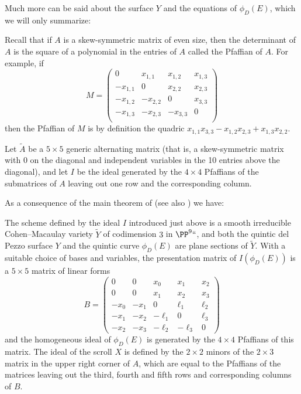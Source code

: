 Much more can be said about the surface $Y$ and the equations of $\phi_D(E)$, which we will only summarize:

\begin{fact}
Recall that if $A$ is a skew-symmetric matrix of even size,
%
then the determinant of $A$ is the square of a polynomial in the entries of $A$ called the Pfaffian of $A$. For example, if
%
$$
M = \begin{pmatrix}
0&x_{1,1}&x_{1,2}&x_{1,3}\\
-x_{1,1}&0&x_{2,2}&x_{2,3}\\
-x_{1,2}&-x_{2,2}&0&x_{3,3}\\
-x_{1,3}&-x_{2,3}&-x_{3,3}&0\\
\end{pmatrix}
$$
then the Pfaffian of $M$ is by definition the quadric $x_{1,1}x_{3,3}-x_{1,2}x_{2,3}+x_{1,3}x_{2,2}$.

Let $\tilde A$ be a $5\times 5$ generic alternating matrix (that is, a skew-symmetric matrix with 0 on the diagonal and independent variables
in the 10 entries above the diagonal), and let $I$ be the ideal
generated by the $4\times 4$ Pfaffians of
the submatrices of $A$ leaving out one row and the corresponding column.

\hskip-1pt As a consequence of the main theorem of  \cite{MR453723}
(see also \cite[Theorem 11]{Eisenbud1995}) we have:

\begin{proposition} \label{5x5 Pfaffians}
The scheme defined by
the ideal
$I$ introduced just above
is a smooth irreducible Cohen--Macaulay variety $\tilde Y$ of codimension
$3$ in $\PP^9` `$,
and both the quintic del Pezzo surface $Y$ and the quintic curve $\phi_D(E)$ are plane sections of $\tilde Y$.
With a suitable choice of bases and variables,  the presentation
matrix of $I(\phi_D(E))$ is
a $5\times 5$ matrix of linear forms
$$
B =\begin{pmatrix}
0&0&x_0&x_1&x_2\\
0&0&x_1&x_2&x_3\\
-x_0&-x_1&0&\ell_1&\ell_2\\
-x_1&-x_2&-\ell_1&0&\ell_3\\
-x_2&-x_3&-\ell_2&-\ell_3&0
\end{pmatrix}
$$
and
the homogeneous ideal of $\phi_D(E)$ is generated by the  $4\times 4$ Pfaffians of this matrix. The ideal of
the scroll $X$ is defined by the $2\times 2$ minors of the $2\times 3$ matrix in the upper right corner of $A$, which
are equal to the Pfaffians of the matrices leaving out the
third, fourth and fifth
rows
and corresponding columns of $B$.
\vspace*{-1.4\baselineskip}
\end{proposition}
\end{fact}

